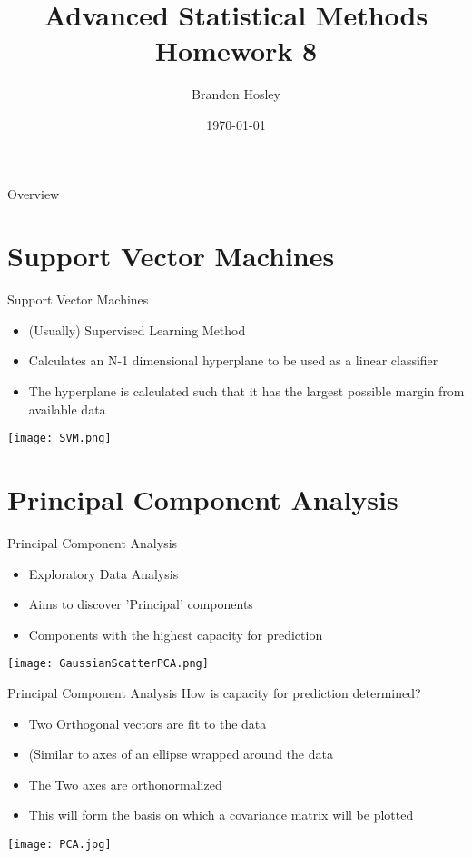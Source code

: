 \documentclass{beamer}
\title{Advanced Statistical Methods \\ Homework 8}
\author{Brandon Hosley}
\institute{University of Illinois - Springfield}
\date{\today}
\begin{document}
\frame{\titlepage}

\begin{frame}{Overview}
\tableofcontents
\end{frame}

\section[SVM]{Support Vector Machines}

\begin{frame}{Support Vector Machines}
	\begin{itemize}
		\item (Usually) Supervised Learning Method
		\item Calculates an N-1 dimensional hyperplane to be used as a linear classifier
		\item The hyperplane is calculated such that it has the largest possible margin from available data
	\end{itemize}
	\vspace{0.25em}
	\centering
	\texttt{[image: SVM.png]}
\end{frame}

\section[PCA]{Principal Component Analysis}

\begin{frame}{Principal Component Analysis}
	\begin{itemize}
		\item Exploratory Data Analysis
		\item Aims to discover 'Principal' components 
		\item[] Components with the highest capacity for prediction
	\end{itemize}
	\centering
	\texttt{[image: GaussianScatterPCA.png]}
\end{frame}

\begin{frame}{Principal Component Analysis}
	How is capacity for prediction determined?
	\begin{itemize}
		\item Two Orthogonal vectors are fit to the data
		\item[] (Similar to axes of an ellipse wrapped around the data
		\item The Two axes are orthonormalized
		\item This will form the basis on which a covariance matrix will be plotted
	\end{itemize}
	\centering
	\texttt{[image: PCA.jpg]}
\end{frame}
\end{document}
